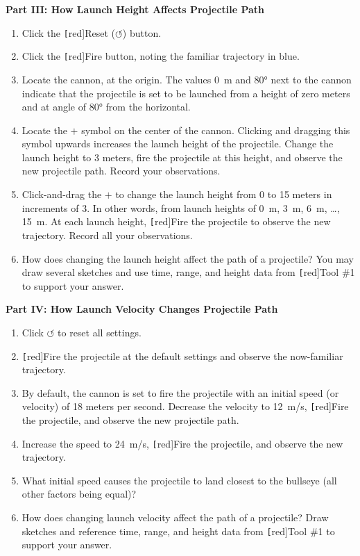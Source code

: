 \documentclass[dvipsnames]{article}
\begin{document}
\textbf{Part III: How Launch Height Affects Projectile Path}
\begin{enumerate}
    \item Click the \texttt[red]{Reset} ($\boldsymbol{\circlearrowleft}$) button.
    \item Click the \texttt[red]{Fire} button, noting the familiar trajectory in blue.
    \item Locate the cannon, at the origin. The values \SI{0}{m} and \ang{80} next to the cannon indicate that the projectile is set to be launched from a height of zero meters and at angle of \ang{80} from the horizontal.
    \item Locate the $\boldsymbol{+}$ symbol on the center of the cannon. Clicking and dragging this symbol upwards increases the launch height of the projectile. Change the launch height to 3 meters, fire the projectile at this height, and observe the new projectile path. Record your observations.
    \item Click-and-drag the $\boldsymbol{+}$ to change the launch height from 0 to 15 meters in increments of 3. In other words, from launch heights of \SI{0}{m}, \SI{3}{m}, \SI{6}{m}, \ldots, \SI{15}{m}. At each launch height, \texttt[red]{Fire} the projectile to observe the new trajectory. Record all your observations. 
    \item How does changing the launch height affect the path of a projectile? You may draw several sketches and use time, range, and height data from \texttt[red]{Tool \#1} to support your answer.
\end{enumerate}

\vspace{1em}

\textbf{Part IV: How Launch Velocity Changes Projectile Path}

\begin{enumerate}
    \item Click $\boldsymbol{\circlearrowleft}$ to reset all settings.
    \item \texttt[red]{Fire} the projectile at the default settings and observe the now-familiar trajectory. 
    \item By default, the cannon is set to fire the projectile with an initial speed (or velocity) of 18 meters per second. Decrease the velocity to \SI{12}{m/s}, \texttt[red]{Fire} the projectile, and observe the new projectile path.
    \item Increase the speed to \SI{24}{m/s}, \texttt[red]{Fire} the projectile, and observe the new trajectory.
    \item What initial speed causes the projectile to land closest to the bullseye (all other factors being equal)?
    \item How does changing launch velocity affect the path of a projectile? Draw sketches and reference time, range, and height data from \texttt[red]{Tool \#1} to support your answer.
\end{enumerate}





    
\end{document}
